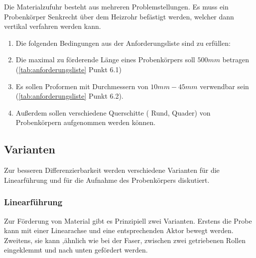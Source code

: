 Die Materialzufuhr besteht aus mehreren Problemstellungen. Es muss ein Probenkörper Senkrecht über dem Heizrohr befästigt werden, welcher dann vertikal verfahren werden kann.



\begin{enumerate}
    \item[]Die folgenden Bedingungen aus der Anforderungsliste sind zu erfüllen: \vspace{2mm}
    \item Die maximal zu förderende Länge eines Probenkörpers soll $500mm$ betragen (\ref{tab:anforderungsliste} Punkt 6.1)
    \item Es sollen Proformen mit Durchmessern von $10mm-45mm$ verwendbar sein (\ref{tab:anforderungsliste} Punkt 6.2).
    \item Außerdem sollen verschiedene Querschitte ( Rund, Quader) von Probenkörpern aufgenommen werden können.
\end{enumerate}

\subsection{Varianten}
Zur besseren Differenzierbarkeit werden verschiedene Varianten für die Linearführung und für die Aufnahme des Probenkörpers  diskutiert.

\subsubsection{Linearführung}
Zur Förderung von Material gibt es Prinzipiell zwei Varianten. Erstens die Probe kann mit einer Linearachse und eine entsprechenden Aktor bewegt werden. Zweitens, sie kann ,ähnlich wie bei der Faser, zwischen zwei getriebenen Rollen eingeklemmt und nach unten gefördert werden. 

